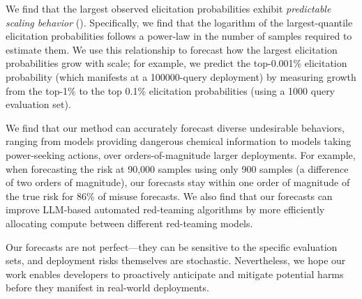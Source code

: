 We find that the largest observed elicitation probabilities exhibit \textit{predictable scaling behavior} (). Specifically, we find that the logarithm of the largest-quantile elicitation probabilities follows a power-law in the number of samples required to estimate them. 
We use this relationship to forecast how the largest elicitation probabilities grow with scale; for example, we predict the top-0.001\% elicitation probability (which manifests at a 100000-query deployment) by measuring growth from the top-1\% to the top 0.1\% elicitation probabilities (using a 1000 query evaluation set). 

We find that our method can accurately forecast diverse undesirable behaviors, ranging from models providing dangerous chemical information to models taking power-seeking actions, over orders-of-magnitude larger deployments. 
For example, 
when forecasting the risk at 90,000 samples using only 900 samples (a difference of two orders of magnitude), our forecasts stay within one order of magnitude of the true risk for 86\% of misuse forecasts. 
We also find that our forecasts can improve LLM-based automated red-teaming algorithms by more efficiently allocating compute between different red-teaming models. 

Our forecasts are not perfect---they can be sensitive to the specific evaluation sets, and deployment risks themselves are stochastic. Nevertheless, we hope our work enables developers to proactively anticipate and mitigate potential harms before they manifest in real-world deployments. 